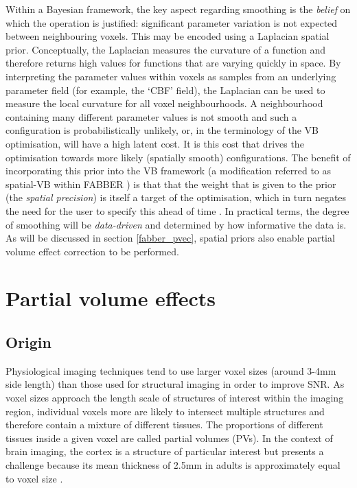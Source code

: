 Within a Bayesian framework, the key aspect regarding smoothing is the \textit{belief} on which the operation is justified: significant parameter variation is not expected between neighbouring voxels. This may be encoded using a Laplacian spatial prior. Conceptually, the Laplacian measures the curvature of a function and therefore returns high values for functions that are varying quickly in space. By interpreting the parameter values within voxels as samples from an underlying parameter field (for example, the `CBF' field), the Laplacian can be used to measure the local curvature for all voxel neighbourhoods. A neighbourhood containing many different parameter values is not smooth and such a configuration is probabilistically unlikely, or, in the terminology of the VB optimisation, will have a high latent cost. It is this cost that drives the optimisation towards more likely (spatially smooth) configurations. The benefit of incorporating this prior into the VB framework (a modification referred to as spatial-VB within FABBER \cite{Chappell2011}) is that that the weight that is given to the prior (the \textit{spatial precision}) is itself a target of the optimisation, which in turn negates the need for the user to specify this ahead of time \cite{Penny2005}. In practical terms, the degree of smoothing will be \textit{data-driven} and determined by how informative the data is. As will be discussed in section \ref{fabber_pvec}, spatial priors also enable partial volume effect correction to be performed. 


\section{Partial volume effects}

\subsection{Origin}

Physiological imaging techniques tend to use larger voxel sizes (around 3-4mm side length) than those used for structural imaging in order to improve SNR. As voxel sizes approach the length scale of structures of interest within the imaging region, individual voxels more are likely to intersect multiple structures and therefore contain a mixture of different tissues. The proportions of different tissues inside a given voxel are called partial volumes (PVs). In the context of brain imaging, the cortex is a structure of particular interest but presents a challenge because its mean thickness of 2.5mm in adults is approximately equal to voxel size \cite{Fischl1999a}.  

